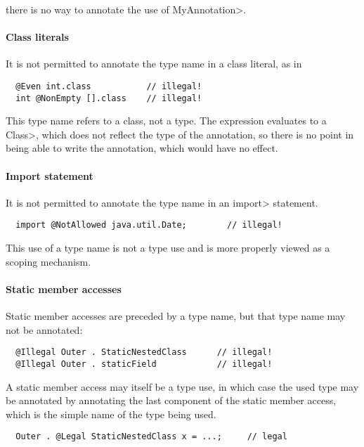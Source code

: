 \documentclass[10pt]{article}
\begin{document}
\noindent
there is no way to annotate the use of \<MyAnnotation>.

\paragraph{Class literals}
It is not permitted to annotate the type name in a class literal, as in

\preverbnegspace
\begin{Verbatim}
  @Even int.class           // illegal!
  int @NonEmpty [].class    // illegal!
\end{Verbatim}
\preverbnegspace

\noindent
This type name refers to a class, not a type.  The expression evaluates to a
\<Class>, which does not reflect the type of the annotation, so there is no
point in being able to write the annotation, which would have no effect.

\paragraph{Import statement}
It is not permitted to annotate the type name in an \<import> statement.

\preverbnegspace
\begin{Verbatim}
  import @NotAllowed java.util.Date;        // illegal!
\end{Verbatim}
\preverbnegspace

\noindent
This use of a type name is not a type use and is more properly viewed as
a scoping mechanism.

\paragraph{Static member accesses}

Static member accesses are preceded by a type name, but that type name may
not be annotated:

\preverbnegspace
\begin{Verbatim}
  @Illegal Outer . StaticNestedClass      // illegal!
  @Illegal Outer . staticField            // illegal!
\end{Verbatim}
\preverbnegspace

\noindent
A static member access may itself be a type use, in which case the used
type may be annotated by annotating the last component of the static member
access, which is the simple name of the type being used.

\preverbnegspace
\begin{Verbatim}
  Outer . @Legal StaticNestedClass x = ...;     // legal
\end{Verbatim}
\preverbnegspace
\end{document}
